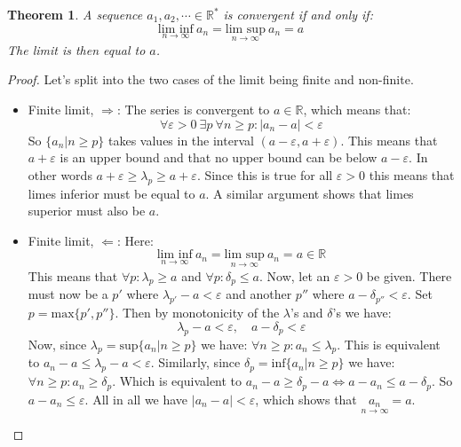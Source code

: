 \documentclass[12pt, a4paper]{article}
\newtheorem{theorem}{Theorem}[section]
\numberwithin{equation}{section}
\begin{document}
\begin{theorem}
\label{liminf_limsup}
A sequence $a_1,a_2,\cdots\in\mathbb{R}^*$ is convergent if and only if:
\begin{equation}
\underset{n\rightarrow\infty}{\textrm{lim inf}}\ a_n=\underset{n\rightarrow\infty}{\textrm{lim sup}}\ a_n=a
\end{equation}
The limit is then equal to $a$. 
\end{theorem}
\begin{proof}
Let's split into the two cases of the limit being finite and non-finite.
\begin{itemize}
\item Finite limit, $\Rightarrow$: The series is convergent to $a\in\mathbb{R}$, which means that:
\begin{equation}
\forall\varepsilon>0\ \exists p\ \forall n\ge p: |a_n-a|<\varepsilon
\end{equation}
So $\{a_n|n\ge p\}$ takes values in the interval $(a-\varepsilon,a+\varepsilon)$. This means that $a+\varepsilon$ is an upper bound and that no upper bound can be below $a-\varepsilon$. In other words $a+\varepsilon\ge\lambda_p\ge a+\varepsilon$. Since this is true for all $\varepsilon>0$ this means that limes inferior must be equal to $a$. A similar argument shows that limes superior must also be $a$.
\item Finite limit, $\Leftarrow$: Here:
\begin{equation}
\underset{n\rightarrow\infty}{\textrm{lim inf}}\ a_n=\underset{n\rightarrow\infty}{\textrm{lim sup}}\ a_n=a\in\mathbb{R}
\end{equation}
This means that $\forall p:\lambda_p\ge a$ and $\forall p:\delta_p\le a$. Now, let an $\varepsilon>0$ be given. There must now be a $p'$ where $\lambda_{p'}-a<\varepsilon$ and another $p''$ where $a-\delta_{p''}<\varepsilon$. Set $p=\textrm{max}\{p',p''\}$. Then by monotonicity of the $\lambda$'s and $\delta$'s we have:
\begin{equation}
\lambda_p-a<\varepsilon,\quad a-\delta_p<\varepsilon
\end{equation}
Now, since $\lambda_p=\textrm{sup}\{a_n|n\ge p\}$ we have:
$\forall n\ge p: a_n\le\lambda_p$. This is equivalent to $a_n-a\le\lambda_p-a<\varepsilon$. Similarly, since $\delta_p=\textrm{inf}\{a_n|n\ge p\}$ we have: $\forall n\ge p: a_n\ge\delta_p$. Which is equivalent to $a_n-a\ge\delta_p-a\Leftrightarrow a-a_n\le a-\delta_p$. So $a-a_n\le\varepsilon$. All in all we have $|a_n-a|<\varepsilon$, which shows that $\underset{n\rightarrow\infty}{a_n}=a$.

\end{itemize}
\end{proof}
\end{document}
